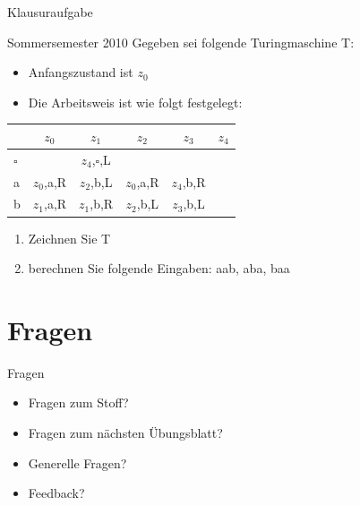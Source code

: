 \begin{frame}{Klausuraufgabe}
	\begin{block} {Sommersemester 2010}
		Gegeben sei folgende Turingmaschine T:
		
		\begin{itemize}
			\item Anfangszustand ist $z_0$
			\item Die Arbeitsweis ist wie folgt festgelegt:
		\end{itemize}
		
    \begin{table}
        \begin{tabular}{lccccc}
        \toprule
                  & $z_0$     & $z_1$             & $z_2$         & $z_3$ & $z_4$ \\
        \midrule
        $\square$ &       & $z_4$,$\square$,L &      &   & \\
        a         &  $z_0$,a,R &  $z_2$,b,L        &  $z_0$,a,R     &  $z_4$,b,R & \\
        b         &  $z_1$,a,R      &    $z_1$,b,R     &   $z_2$,b,L  & $z_3$,b,L &  \\
        \bottomrule
        \end{tabular}
    \end{table}
    
    \begin{enumerate}
    	\item Zeichnen Sie T
    	\item berechnen Sie folgende Eingaben: aab, aba, baa
    \end{enumerate}
	\end{block}
\end{frame}
	
	
	\section{Fragen}
	\begin{frame} {Fragen}
		\begin{itemize}
			\item Fragen zum Stoff?
			\item Fragen zum n\"achsten \"Ubungsblatt?
			\item Generelle Fragen?
			\item Feedback?
		\end{itemize}
	\end{frame}	
		
